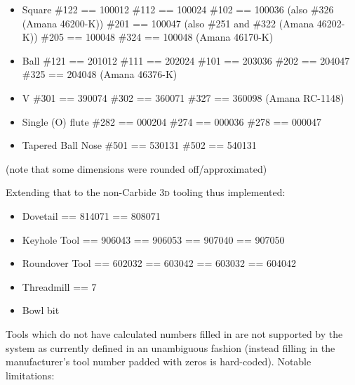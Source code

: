 \documentclass{ltxdoc}
\begin{document}
\begin{itemize}
\item Square
\subitem \#122 == 100012
\subitem \#112 == 100024
\subitem \#102 == 100036 (also \#326 (Amana 46200-K))
\subitem \#201 == 100047 (also \#251 and \#322 (Amana 46202-K))
\subitem \#205 == 100048
\subitem \#324 == 100048 (Amana 46170-K)

\item Ball
\subitem \#121 == 201012
\subitem \#111 == 202024
\subitem \#101 == 203036
\subitem \#202 == 204047
\subitem \#325 == 204048 (Amana 46376-K)

\item V
\subitem \#301 == 390074
\subitem \#302 == 360071
\subitem \#327 == 360098 (Amana RC-1148)

\item Single (O) flute
\subitem \#282 == 000204
\subitem \#274 == 000036
\subitem \#278 == 000047

\item Tapered Ball Nose
\subitem \#501 == 530131
\subitem \#502 == 540131
\end{itemize}

(note that some dimensions were rounded off/approximated)

Extending that to the non-Carbide \textsc{3d} tooling thus implemented:

\begin{itemize}
\item Dovetail
 == 814071
 == 808071

\item Keyhole Tool
 == 906043
 == 906053
 == 907040
 == 907050

\item Roundover Tool
 == 602032
 == 603042
 == 603032
 == 604042

%
\item Threadmill
 == 7

\item Bowl bit

\end{itemize}

Tools which do not have calculated numbers filled in are not supported by the system as currently defined in an unambiguous fashion (instead filling in the manufacturer's tool number padded with zeros is hard-coded). Notable limitations:
\end{document}
